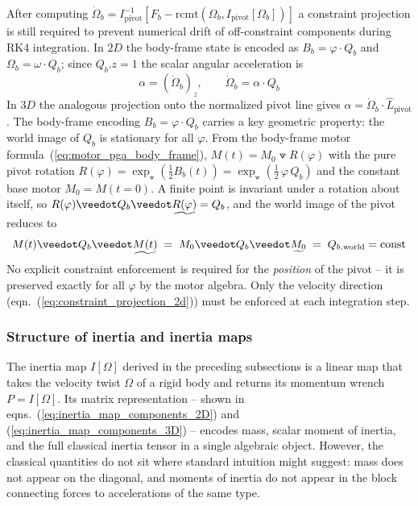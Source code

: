 After computing $\dot{\Omega}_b = I_\text{pivot}^{-1}[F_b - \mathrm{rcmt}(\Omega_b,
I_\text{pivot}[\Omega_b])]$ a constraint projection is still required to prevent numerical
drift of off-constraint components during RK4 integration.
In $2D$ the body-frame state is encoded as $B_b = \varphi \cdot Q_b$
and $\Omega_b = \omega \cdot Q_b$; since $Q_b.z = 1$ the scalar angular acceleration is
\begin{equation}
    \alpha = (\dot{\Omega}_b)_z, \qquad \dot{\Omega}_b = \alpha \cdot Q_b
    \label{eq:constraint_projection_2d}
\end{equation}
In $3D$ the analogous projection onto the normalized pivot line gives $\alpha =
\dot{\Omega}_b \cdot \hat{L}_\text{pivot}$. The body-frame encoding $B_b = \varphi \cdot
Q_b$ carries a key geometric property: the world image of $Q_b$ is stationary for all
$\varphi$.
From the body-frame motor
formula~(\ref{eq:motor_pga_body_frame}), $M(t) = M_0 \veedot R(\varphi)$ with the pure
pivot rotation $R(\varphi) = \exp_\veedot(\tfrac{1}{2} B_b(t)) = \exp_\veedot(\tfrac{1}{2}\,
\varphi\, Q_b)$ and the constant base motor $M_0 = M(t{=}0)$. A finite point is invariant
under a rotation about itself, so $R(\varphi) \veedot Q_b \veedot \rrev{R(\varphi)} = Q_b$,
and the world image of the pivot reduces to
\begin{equation}
    M(t) \veedot Q_b \veedot \rrev{M(t)}
    \;=\; M_0 \veedot Q_b \veedot \rrev{M_0}
    \;=\; Q_{b,\text{world}} = \text{const}
    \label{eq:pivot_invariance}
\end{equation}
No explicit constraint enforcement is required for the \emph{position} of the pivot -- it
is preserved exactly for all $\varphi$ by the motor algebra. Only the velocity direction
(eqn.~(\ref{eq:constraint_projection_2d})) must be enforced at each integration step. \\


\newpage

\subsubsection{Structure of inertia and inertia maps}
\label{subsubsection:structure_inertia_maps}

The inertia map $I[\Omega]$ derived in the preceding subsections is a linear map that
takes the velocity twist $\Omega$ of a rigid body and returns its momentum wrench $P =
I[\Omega]$. Its matrix representation -- shown in
eqns.~(\ref{eq:inertia_map_components_2D}) and (\ref{eq:inertia_map_components_3D}) --
encodes mass, scalar moment of inertia, and the full classical inertia tensor in a single
algebraic object. However, the classical quantities do not sit where standard intuition
might suggest: mass does not appear on the diagonal, and moments of inertia do not appear
in the block connecting forces to accelerations of the same type. \\

